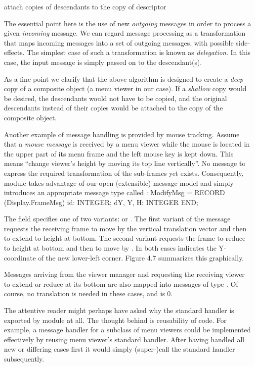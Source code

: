 attach copies of descendants to the copy of descriptor

\noindent The essential point here is the use of new \emph{outgoing} messages in order
to process a given \emph{incoming} message. We can regard message processing
as a transformation that maps incoming messages into a set of outgoing
messages, with possible side-effects. The simplest case of such a
transformation is known as \emph{delegation}. In this case, the input message
is simply passed on to the descendant(s).

As a fine point we clarify that the above algorithm is designed to
create a \emph{deep} copy of a composite object (a menu viewer in our
case). If a \emph{shallow} copy would be desired, the descendants would not
have to be copied, and the original descendants instead of their
copies would be attached to the copy of the composite object.

Another example of message handling is provided by mouse
tracking. Assume that a \emph{mouse message} is received by a menu viewer
while the mouse is located in the upper part of its menu frame and the
left mouse key is kept down. This means ``change viewer's height by
moving its top line vertically''. No message to express the required
transformation of the sub-frames yet exists. Consequently, module
 takes advantage of our open (extensible) message model and
simply introduces an appropriate message type called :
\begintt
ModifyMsg = RECORD (Display.FrameMsg)
  id: INTEGER;
  dY, Y, H: INTEGER
END;
\endtt

\noindent The field  specifies one of two variants:  or . The first variant of the message requests the receiving frame to move by the vertical translation vector  and then to extend to height  at bottom. The second variant requests the frame to reduce to height  at bottom and then to move by . In both cases  indicates the Y-coordinate of the new lower-left corner. Figure 4.7 summarizes this graphically.

Messages arriving from the viewer manager and requesting the receiving viewer to extend or reduce at its bottom are also mapped into messages of type . Of course, no translation is needed in these cases, and  is 0.

The attentive reader might perhaps have asked why the standard handler
is exported by module  at all. The thought behind is
reusability of code. For example, a message handler for a subclass of
menu viewers could be implemented effectively by reusing menu viewer's
standard handler. After having handled all new or differing cases
first it would simply (super-)call the standard handler subsequently.

